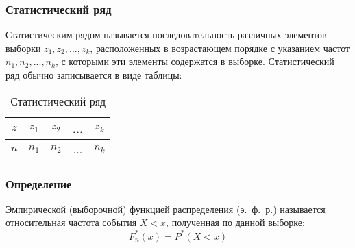 \documentclass[12pt,a4paper]{article}
\begin{document}
	\subsubsection{Статистический ряд}
		Статистическим рядом называется последовательность различных элементов выборки $z_1,z_2, ...,z_k$, расположенных в возрастающем порядке с указанием частот $n_1,n_2, ...,n_k$, с которыми эти элементы содержатся в выборке. Статистический ряд обычно записывается в виде таблицы:
		\begin{center}
			\begin{table}[h]
				\begin{center}
					\begin{tabular}{|c|c|c|c|c|}
						\hline
						$z$ & $z_1$ & $z_2$ & ... & $z_k$\\
						\hline
						$n$ & $n_1$ & $n_2$ & ... & $n_k$\\
						\hline
					\end{tabular}
				\end{center}
			\caption{Статистический ряд}
			\end{table}
		\end{center}
	
	\subsubsection{Определение}
		Эмпирической (выборочной) функцией распределения (э.~ф.~р.) называется относительная частота события $X < x$, полученная по данной выборке:
		\begin{equation}\label{eqn:edf_prob}
			F^*_n(x) = P^*(X < x)
		\end{equation}
		
\end{document}
